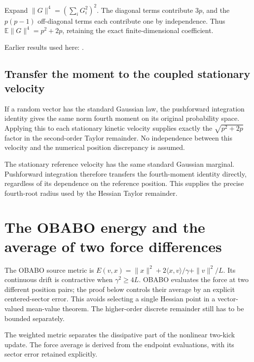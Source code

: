 \documentclass[11pt,a4paper]{report}
\begin{document}
Expand \(\|G\|^4=(\sum_iG_i^2)^2\). The diagonal terms contribute \(3p\), and the \(p(p-1)\) off-diagonal terms each contribute one by independence. Thus \(\mathbb E\|G\|^4=p^2+2p\), retaining the exact finite-dimensional coefficient.



Earlier results used here: \cite[Section~3.4.1]{LangevinLean2026ULASC}.
\subsection{\texorpdfstring{Transfer the moment to the coupled stationary velocity}{Transfer the moment to the coupled stationary velocity}}
\label{report-step-KineticLangevin-GaussianFourth-lean-3}


If a random vector has the standard Gaussian law, the pushforward integration identity gives the same norm fourth moment on its original probability space. Applying this to each stationary kinetic velocity supplies exactly the \(\sqrt{p^2+2p}\) factor in the second-order Taylor remainder. No independence between this velocity and the numerical position discrepancy is assumed.



The stationary reference velocity has the same standard Gaussian marginal. Pushforward integration therefore transfers the fourth-moment identity directly, regardless of its dependence on the reference position. This supplies the precise fourth-root radius used by the Hessian Taylor remainder.

\section{\texorpdfstring{The OBABO energy and the average of two force differences}{The OBABO energy and the average of two force differences}}
\label{proof-module-KineticLangevin-OBABOEnergy-lean}


The OBABO source metric is \(E(v,x)=\|x\|^2+2\langle x,v\rangle/\gamma+\|v\|^2/L\). Its continuous drift is contractive when \(\gamma^2\ge4L\). OBABO evaluates the force at two different position pairs; the proof below controls their average by an explicit centered-sector error. This avoids selecting a single Hessian point in a vector-valued mean-value theorem. The higher-order discrete remainder still has to be bounded separately.



The weighted metric separates the dissipative part of the nonlinear two-kick update. The force average is derived from the endpoint evaluations, with its sector error retained explicitly.
\end{document}
